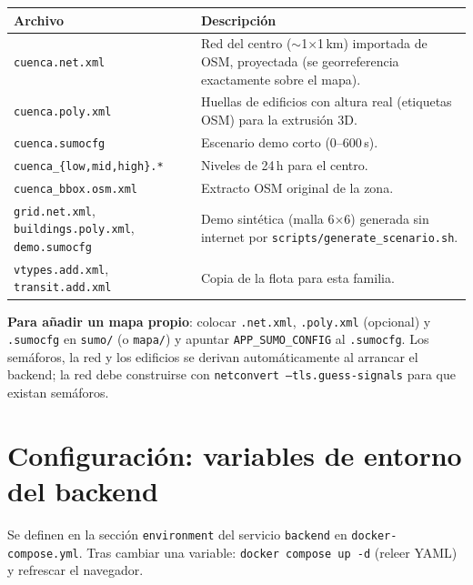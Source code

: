 \documentclass[11pt,a4paper]{article}
\begin{document}
\begin{longtable}{@{}p{5.6cm}p{8.9cm}@{}}
\toprule
\textbf{Archivo} & \textbf{Descripción} \\
\midrule
\texttt{cuenca.net.xml} & Red del centro ($\sim$1$\times$1\,km) importada de OSM,
  proyectada (se georreferencia exactamente sobre el mapa). \\
\texttt{cuenca.poly.xml} & Huellas de edificios con altura real (etiquetas OSM)
  para la extrusión 3D. \\
\texttt{cuenca.sumocfg} & Escenario demo corto (0--600\,s). \\
\texttt{cuenca\_\{low,mid,high\}.*} & Niveles de 24\,h para el centro. \\
\texttt{cuenca\_bbox.osm.xml} & Extracto OSM original de la zona. \\
\texttt{grid.net.xml}, \texttt{buildings.poly.xml}, \texttt{demo.sumocfg} &
  Demo sintética (malla 6$\times$6) generada sin internet por
  \texttt{scripts/generate\_scenario.sh}. \\
\texttt{vtypes.add.xml}, \texttt{transit.add.xml} & Copia de la flota para esta
  familia. \\
\bottomrule
\end{longtable}

\textbf{Para añadir un mapa propio}: colocar \texttt{.net.xml},
\texttt{.poly.xml} (opcional) y \texttt{.sumocfg} en \texttt{sumo/} (o
\texttt{mapa/}) y apuntar \texttt{APP\_SUMO\_CONFIG} al \texttt{.sumocfg}. Los
semáforos, la red y los edificios se derivan automáticamente al arrancar el
backend; la red debe construirse con \texttt{netconvert --tls.guess-signals}
para que existan semáforos.

\section{Configuración: variables de entorno del backend}

Se definen en la sección \texttt{environment} del servicio \texttt{backend} en
\texttt{docker-compose.yml}. Tras cambiar una variable:
\texttt{docker compose up -d} (releer YAML) y refrescar el navegador.
\end{document}
